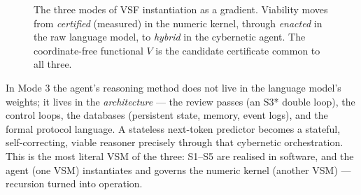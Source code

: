 \documentclass[11pt, a4paper]{article}
\newcommand{\R}{\mathbb{R}}
\begin{document}
\begin{figure}[!htb]
\centering
{}
\caption{The three modes of VSF instantiation as a gradient. Viability moves from
\emph{certified} (measured) in the numeric kernel, through \emph{enacted} in the
raw language model, to \emph{hybrid} in the cybernetic agent. The coordinate-free
functional $V$ is the candidate certificate common to all three.}
\label{fig:three_modes}
\end{figure}

In Mode 3 the agent's reasoning method does not live in the language model's
weights; it lives in the \emph{architecture} --- the review passes (an S3*
double loop), the control loops, the databases (persistent state, memory,
event logs), and the formal protocol language. A stateless next-token predictor
becomes a stateful, self-correcting, viable reasoner precisely through that
cybernetic orchestration. This is the most literal VSM of the three: S1--S5 are
realised in software, and the agent (one VSM) instantiates and governs the
numeric kernel (another VSM) --- recursion turned into operation.
\end{document}
